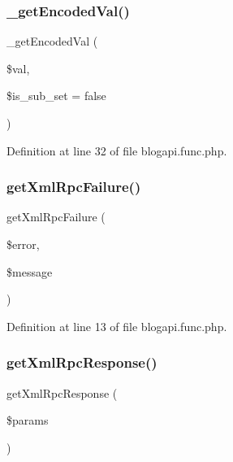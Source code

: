 \subsubsection{\texorpdfstring{\+\_\+get\+Encoded\+Val()}{\_getEncodedVal()}}
{\footnotesize\ttfamily \+\_\+get\+Encoded\+Val (\begin{DoxyParamCaption}\item[{}]{\$val,  }\item[{}]{\$is\+\_\+sub\+\_\+set = {\ttfamily false} }\end{DoxyParamCaption})}



Definition at line 32 of file blogapi.\+func.\+php.

\hypertarget{blogapi_8func_8php_a7e46f8d2f9b3c3115d176926b68b6b09}{}\label{blogapi_8func_8php_a7e46f8d2f9b3c3115d176926b68b6b09} 
\subsubsection{\texorpdfstring{get\+Xml\+Rpc\+Failure()}{getXmlRpcFailure()}}
{\footnotesize\ttfamily get\+Xml\+Rpc\+Failure (\begin{DoxyParamCaption}\item[{}]{\$error,  }\item[{}]{\$message }\end{DoxyParamCaption})}



Definition at line 13 of file blogapi.\+func.\+php.

\hypertarget{blogapi_8func_8php_a18b93e72ecaae5fdfcfe1f0f107238f6}{}\label{blogapi_8func_8php_a18b93e72ecaae5fdfcfe1f0f107238f6} 
\subsubsection{\texorpdfstring{get\+Xml\+Rpc\+Response()}{getXmlRpcResponse()}}
{\footnotesize\ttfamily get\+Xml\+Rpc\+Response (\begin{DoxyParamCaption}\item[{}]{\$params }\end{DoxyParamCaption})}



